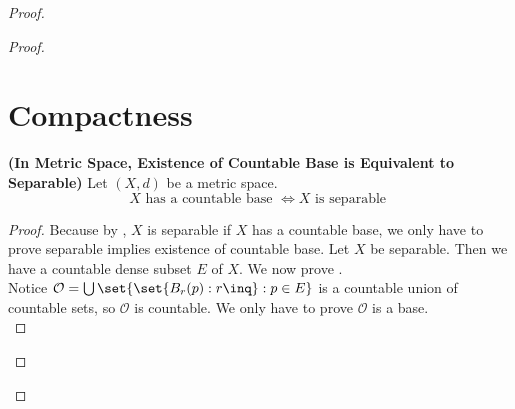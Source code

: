\documentclass{report}
\begin{document}
\begin{proof}
\begin{proof}
\section{Compactness}
\begin{theorem}
\label{3.6.1}
\textbf{(In Metric Space, Existence of Countable Base is Equivalent to Separable)} Let $(X,d)$ be a metric space. 
\begin{equation*}
X\text{ has a countable base }\iff  X\text{ is separable }
\end{equation*}
\end{theorem}
\begin{proof}
Because by , $X$ is separable if  $X$ has a countable base, we only have to prove separable implies existence of countable base. Let $X$ be separable. Then we have a countable dense subset $E$ of $X$. We now prove
.\\

Notice $\mathcal{O}=\bigcup \set{\set{B_r(p):r\inq}:p\in E}$ is a countable union of countable sets, so $\mathcal{O}$ is countable. We only have to prove $\mathcal{O}$ is a base.\\


\end{proof}
\end{proof}
\end{proof}
\end{document}
